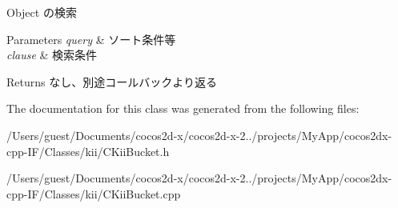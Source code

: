 Object の検索 


\begin{DoxyParams}{Parameters}
{\em query} & ソート条件等 \\
\hline
{\em clause} & 検索条件 \\
\hline
\end{DoxyParams}
\begin{DoxyReturn}{Returns}
なし、別途コールバックより返る 
\end{DoxyReturn}


The documentation for this class was generated from the following files\-:\begin{DoxyCompactItemize}
\item 
/\-Users/guest/\-Documents/cocos2d-\/x/cocos2d-\/x-\/2../projects/\-My\-App/cocos2dx-\/cpp-\/\-I\-F/\-Classes/kii/C\-Kii\-Bucket.\-h\item 
/\-Users/guest/\-Documents/cocos2d-\/x/cocos2d-\/x-\/2../projects/\-My\-App/cocos2dx-\/cpp-\/\-I\-F/\-Classes/kii/C\-Kii\-Bucket.\-cpp\end{DoxyCompactItemize}
